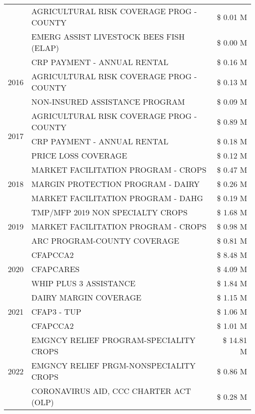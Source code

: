 \begin{tabular}{llr}
 & AGRICULTURAL RISK COVERAGE PROG - COUNTY & \$ 0.01 M \\
 & EMERG ASSIST LIVESTOCK BEES FISH (ELAP) & \$ 0.00 M \\
\cline{1-3}
\multirow[t]{3}{*}{2016} & CRP PAYMENT - ANNUAL RENTAL & \$ 0.16 M \\
 & AGRICULTURAL RISK COVERAGE PROG - COUNTY & \$ 0.13 M \\
 & NON-INSURED ASSISTANCE PROGRAM & \$ 0.09 M \\
\cline{1-3}
\multirow[t]{3}{*}{2017} & AGRICULTURAL RISK COVERAGE PROG - COUNTY & \$ 0.89 M \\
 & CRP PAYMENT - ANNUAL RENTAL & \$ 0.18 M \\
 & PRICE LOSS COVERAGE & \$ 0.12 M \\
\cline{1-3}
\multirow[t]{3}{*}{2018} & MARKET FACILITATION PROGRAM - CROPS & \$ 0.47 M \\
 & MARGIN PROTECTION PROGRAM - DAIRY & \$ 0.26 M \\
 & MARKET FACILITATION PROGRAM - DAHG & \$ 0.19 M \\
\cline{1-3}
\multirow[t]{3}{*}{2019} & TMP/MFP 2019 NON SPECIALTY CROPS & \$ 1.68 M \\
 & MARKET FACILITATION PROGRAM - CROPS & \$ 0.98 M \\
 & ARC PROGRAM-COUNTY COVERAGE & \$ 0.81 M \\
\cline{1-3}
\multirow[t]{3}{*}{2020} & CFAPCCA2 & \$ 8.48 M \\
 & CFAPCARES & \$ 4.09 M \\
 & WHIP PLUS 3 ASSISTANCE & \$ 1.84 M \\
\cline{1-3}
\multirow[t]{3}{*}{2021} & DAIRY MARGIN COVERAGE & \$ 1.15 M \\
 & CFAP3 - TUP & \$ 1.06 M \\
 & CFAPCCA2 & \$ 1.01 M \\
\cline{1-3}
\multirow[t]{3}{*}{2022} & EMGNCY RELIEF PROGRAM-SPECIALITY CROPS & \$ 14.81 M \\
 & EMGNCY RELIEF PRGM-NONSPECIALITY CROPS & \$ 0.86 M \\
 & CORONAVIRUS AID, CCC CHARTER ACT (OLP) & \$ 0.28 M \\
\cline{1-3}
\bottomrule
\end{tabular}
